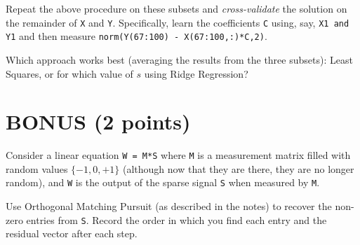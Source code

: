 \documentclass[11pt]{article}
\begin{document}
Repeat the above procedure on these subsets and \emph{cross-validate} the solution on the remainder of \texttt{X} and \texttt{Y}.  Specifically, learn the coefficients \texttt{C} using, say, \texttt{X1 and Y1} and then measure \texttt{norm(Y(67:100) - X(67:100,:)*C,2)}.  

Which approach works best (averaging the results from the three subsets): Least Squares, or for which value of $s$ using Ridge Regression?  

\section{BONUS (2 points)}

Consider a linear equation \texttt{W = M*S} where \texttt{M} is a measurement matrix filled with random values $\{-1, 0, +1\}$ (although now that they are there, they are no longer random), and \texttt{W} is the output of the sparse signal \texttt{S} when measured by \texttt{M}.  

Use Orthogonal Matching Pursuit (as described in the notes) to recover the non-zero entries from \texttt{S}.  Record the order in which you find each entry and the residual vector after each step.  
\end{document}
